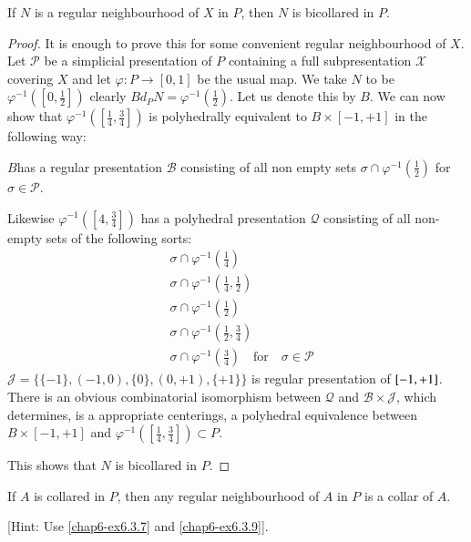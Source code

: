 \begin{proposition}\label{chap6-prop6.4.3}
If $N$ is a regular neighbourhood of $X$ in $P$, then $N$ is bicollared in $P$.
\end{proposition}

\begin{proof}
It is enough to prove this for some convenient regular neighbourhood of $X$. Let $\mathscr{P}$ be a simplicial presentation of $P$ containing a full subpresentation $\mathscr{X}$ covering $X$ and let $\varphi:P\to [0,1]$ be the usual map. We take $N$ to be $\varphi^{-1}([0,\frac{1}{2}])$ clearly $Bd_{P}N=\varphi^{-1}(\frac{1}{2})$. Let us denote this by $B$. We can now show that $\varphi^{-1}([\frac{1}{4},\frac{3}{4}])$ is polyhedrally equivalent to $B\times [-1,+1]$ in the following way: 

$B$\pageoriginale has a regular presentation $\mathscr{B}$ consisting of all non empty sets $\sigma\cap \varphi^{-1}(\frac{1}{2})$ for $\sigma\in \mathscr{P}$.

Likewise $\varphi^{-1}([4,\frac{3}{4}])$ has a polyhedral presentation $\mathcal{Q}$ consisting of all non-empty sets of the following sorts:
\begin{align*}
& \sigma\cap \varphi^{-1}(\frac{1}{4})\\
& \sigma\cap \varphi^{-1}(\frac{1}{4},\frac{1}{2})\\
& \sigma\cap \varphi^{-1}(\frac{1}{2})\\
& \sigma\cap\varphi^{-1}(\frac{1}{2},\frac{3}{4})\\
& \sigma \cap \varphi^{-1}(\frac{3}{4})\quad\text{for}\quad \sigma\in \mathscr{P} 
\end{align*}
$\mathscr{J}=\{\{-1\},(-1,0),\{0\},(0,+1),\{+1\}\}$ is regular
presentation of $[-1,\break +1]$. There is an obvious combinatorial isomorphism between $\mathcal{Q}$ and $\mathscr{B}\times\mathscr{J}$, which determines, is a appropriate centerings, a polyhedral equivalence between $B\times[-1,+1]$ and $\varphi^{-1}([\frac{1}{4},\frac{3}{4}])\subset P$.

This shows that $N$ is bicollared in $P$.
\end{proof}

\begin{ex}\label{chap6-ex6.4.4}
If $A$ is collared in $P$, then any regular neighbourhood of $A$ in $P$ is a collar of $A$.

[Hint: Use \ref{chap6-ex6.3.7} and \ref{chap6-ex6.3.9}].
\end{ex}

